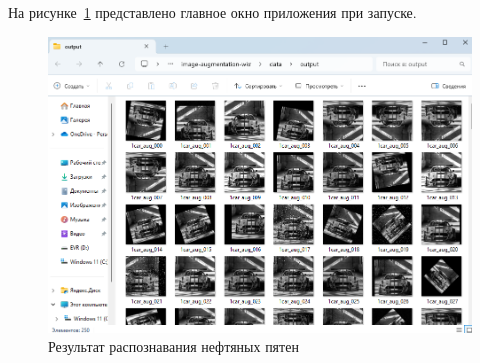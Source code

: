На рисунке~\ref{fig:systest7} представлено главное окно приложения при запуске.
\begin{figure}[H]
	\centering
	\includegraphics[width=0.5\linewidth]{"images/systest7"}
	\caption{Результат распознавания нефтяных пятен}
	\label{fig:systest7}
\end{figure}

